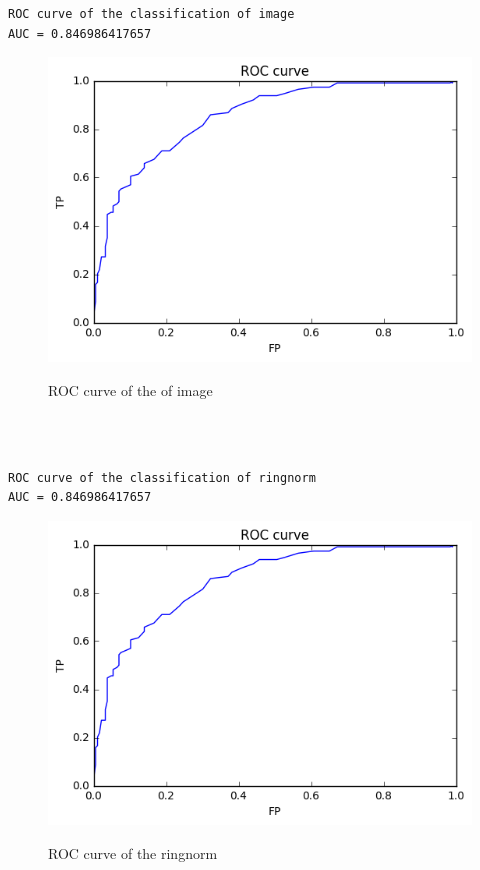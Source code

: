 \documentclass[a4paper,11pt]{article}
\begin{document}
\begin{verbatim}



\end{verbatim}

\begin{verbatim}
ROC curve of the classification of image 
AUC = 0.846986417657
\end{verbatim}

\begin{figure}[htbp]
 \centering 
  \includegraphics[scale=0.6]{rocdl.png}\\
    \caption{ROC curve of the of image }
\end{figure}

\begin{verbatim}



\end{verbatim}


\begin{verbatim}
ROC curve of the classification of ringnorm
AUC = 0.846986417657
\end{verbatim}

\begin{figure}[htbp]
 \centering 
  \includegraphics[scale=0.6]{rocdl.png}\\
    \caption{ROC curve of the ringnorm }
\end{figure}
\end{document}
